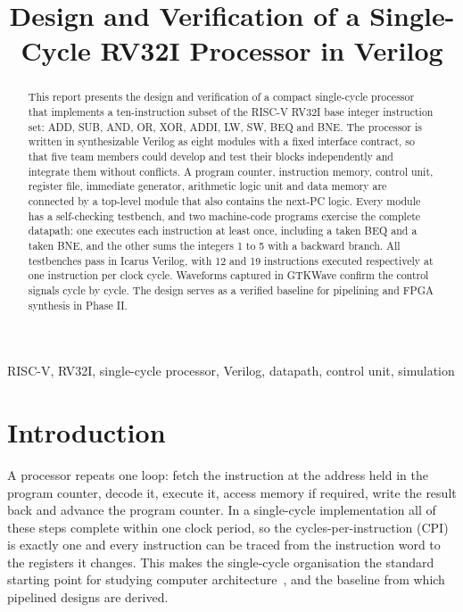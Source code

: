 \documentclass[conference]{IEEEtran}
\begin{document}
\title{Design and Verification of a Single-Cycle RV32I Processor in Verilog}

\author{
}

\maketitle

\begin{abstract}
This report presents the design and verification of a compact single-cycle
processor that implements a ten-instruction subset of the RISC-V RV32I base
integer instruction set: ADD, SUB, AND, OR, XOR, ADDI, LW, SW, BEQ and BNE.
The processor is written in synthesizable Verilog as eight modules with a
fixed interface contract, so that five team members could develop and test
their blocks independently and integrate them without conflicts. A program
counter, instruction memory, control unit, register file, immediate
generator, arithmetic logic unit and data memory are connected by a top-level
module that also contains the next-PC logic. Every module has a self-checking
testbench, and two machine-code programs exercise the complete datapath: one
executes each instruction at least once, including a taken BEQ and a taken
BNE, and the other sums the integers 1 to 5 with a backward branch. All
testbenches pass in Icarus Verilog, with 12 and 19 instructions executed
respectively at one instruction per clock cycle. Waveforms captured in GTKWave
confirm the control signals cycle by cycle. The design serves as a verified
baseline for pipelining and FPGA synthesis in Phase II.
\end{abstract}

\begin{IEEEkeywords}
RISC-V, RV32I, single-cycle processor, Verilog, datapath, control unit, simulation
\end{IEEEkeywords}

\section{Introduction}
A processor repeats one loop: fetch the instruction at the address held in
the program counter, decode it, execute it, access memory if required, write
the result back and advance the program counter. In a single-cycle
implementation all of these steps complete within one clock period, so the
cycles-per-instruction (CPI) is exactly one and every instruction can be
traced from the instruction word to the registers it changes. This makes the
single-cycle organisation the standard starting point for studying computer
architecture~\cite{patterson2020computer,harris2021digital}, and the baseline
from which pipelined designs are derived.
\end{document}
